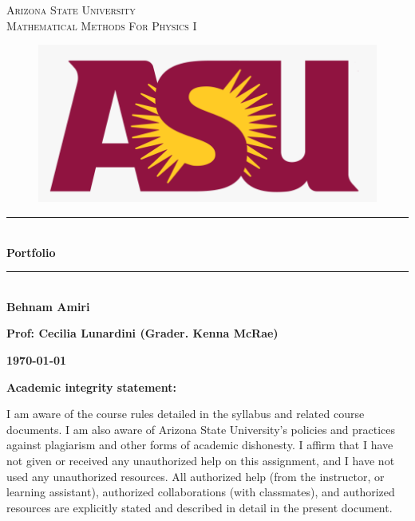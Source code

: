 \documentclass[fleqn]{article}
\begin{document}
\begin{titlepage}

\newcommand{\HRule}{\rule{\linewidth}{0.5mm}} %

\center %
 

\textsc{\LARGE Arizona State University}\\[1.5cm] 

\textsc{\Large Mathematical Methods For Physics I }\\[0.5cm]


\begin{figure}
  \includegraphics[width=\linewidth]{asu.png}
\end{figure}


\HRule \\[0.4cm]
{ \huge \bfseries Portfolio}\\[0.4cm] 
\HRule \\[1.5cm]
 
\textbf{Behnam Amiri}

\bigbreak

\textbf{Prof: Cecilia Lunardini (Grader. Kenna McRae)}

\bigbreak


\textbf{{\large \today}\\[2cm]}

\vfill %

\end{titlepage}

\huge \textbf{Academic integrity statement:}

\bigbreak

\Large I am aware of the course rules detailed in the syllabus and related course documents. I am also aware of Arizona State University’s policies and practices against plagiarism and other forms of academic dishonesty. I affirm that I have not given or received any unauthorized help on this assignment, and I have not used any unauthorized resources. All authorized help (from the instructor, or learning assistant), authorized collaborations (with classmates), and authorized resources are explicitly stated and described in detail in the present document.
\end{document}
